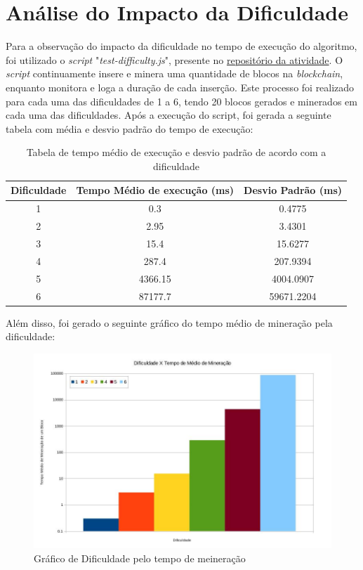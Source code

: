 \documentclass{article}
\begin{document}
\section{Análise do Impacto da Dificuldade}
Para a observação do impacto da dificuldade no tempo de execução do algoritmo, foi utilizado o \textit{script} "\textit{test-difficulty.js}", presente no \href{https://github.com/caioasmuniz/local-blockchain}{repositório da atividade}. O \textit{script} continuamente insere e minera uma quantidade de blocos na \textit{blockchain}, enquanto monitora e loga a duração de cada inserção. Este processo foi realizado para cada uma das dificuldades de 1 a 6, tendo 20 blocos gerados e minerados em cada uma das dificuldades. Após a execução do script, foi gerada a seguinte tabela com média e desvio padrão do tempo de execução:
\begin{table}[h]
  \begin{tabular}{| c | c | c |}
    \hline
    Dificuldade & Tempo Médio de execução (ms) & Desvio Padrão (ms) \\
    \hline
    1           & 0.3                          & 0.4775             \\
    \hline
    2           & 2.95                         & 3.4301             \\
    \hline
    3           & 15.4                         & 15.6277            \\
    \hline
    4           & 287.4                        & 207.9394           \\
    \hline
    5           & 4366.15                      & 4004.0907          \\
    \hline
    6           & 87177.7                      & 59671.2204         \\
    \hline
  \end{tabular}
  \caption{Tabela de tempo médio de execução e desvio padrão de acordo com a dificuldade}
\end{table}

Além disso, foi gerado o seguinte gráfico do tempo médio de mineração pela dificuldade:
\begin{figure}[h]
  \includegraphics[width=\textwidth]{difficulty-graph.jpg}
  \caption{Gráfico de Dificuldade pelo tempo de meineração}
\end{figure}
\end{document}
